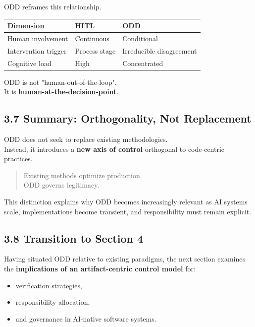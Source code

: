 \documentclass[
]{article}
\begin{document}
ODD reframes this relationship.

\begin{longtable}[]{@{}lll@{}}
\toprule()
Dimension & HITL & ODD \\
\midrule()
\endhead
Human involvement & Continuous & Conditional \\
Intervention trigger & Process stage & Irreducible disagreement \\
Cognitive load & High & Concentrated \\
\bottomrule()
\end{longtable}

ODD is not "human-out-of-the-loop".\\
It is \textbf{human-at-the-decision-point}.

\hypertarget{37-summary-orthogonality-not-replacement}{%
\subsection{3.7 Summary: Orthogonality, Not
Replacement}\label{37-summary-orthogonality-not-replacement}}

ODD does not seek to replace existing methodologies.\\
Instead, it introduces a \textbf{new axis of control} orthogonal to
code-centric practices.

\begin{quote}
Existing methods optimize production.\\
ODD governs legitimacy.
\end{quote}

This distinction explains why ODD becomes increasingly relevant as AI
systems scale, implementations become transient, and responsibility must
remain explicit.

\hypertarget{38-transition-to-section-4}{%
\subsection{3.8 Transition to Section
4}\label{38-transition-to-section-4}}

Having situated ODD relative to existing paradigms, the next section
examines the \textbf{implications of an artifact-centric control model}
for:

\begin{itemize}
\item
  verification strategies,
\item
  responsibility allocation,
\item
  and governance in AI-native software systems.
\end{itemize}
\end{document}
